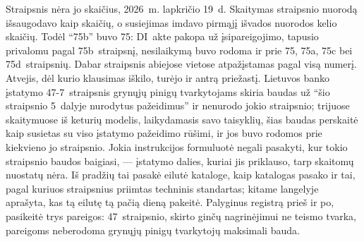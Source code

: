 \begin{lessonbox}{Straipsnis nėra jo skaičius, 2026~m. lapkričio 19~d.}
Skaitymas straipsnio nuorodą išsaugodavo kaip skaičių, o susiejimas imdavo pirmąjį išvados
nuorodos kelio skaičių. Todėl \enquote{75b} buvo 75: DI~akte pakopa už įsipareigojimo, tapusio
privalomu pagal 75b~straipsnį, nesilaikymą buvo rodoma ir prie 75, 75a, 75c bei 75d~straipsnių.
Dabar straipsnis abiejose vietose atpažįstamas pagal visą numerį. Atvejis, dėl kurio klausimas
iškilo, turėjo ir antrą priežastį. Lietuvos banko įstatymo 47-7~straipsnis grynųjų pinigų
tvarkytojams skiria baudas už \enquote{šio straipsnio 5~dalyje nurodytus pažeidimus} ir
nenurodo jokio straipsnio; trijuose skaitymuose iš keturių modelis, laikydamasis savo
taisyklių, šias baudas perskaitė kaip susietas su viso įstatymo pažeidimo rūšimi, ir jos buvo
rodomos prie kiekvieno jo straipsnio. Jokia instrukcijos formuluotė negali pasakyti, kur tokio
straipsnio baudos baigiasi, --- įstatymo dalies, kuriai jis priklauso, tarp skaitomų nuostatų
nėra. Iš pradžių tai pasakė eilutė kataloge, kaip katalogas pasako ir tai, pagal kuriuos
straipsnius priimtas techninis standartas; kitame langelyje aprašyta, kas tą eilutę tą pačią
dieną pakeitė. Palyginus registrą prieš ir po, pasikeitė trys pareigos: 47~straipsnio,
skirto ginčų nagrinėjimui ne teismo tvarka, pareigoms neberodoma grynųjų pinigų tvarkytojų
maksimali bauda.
\end{lessonbox}

